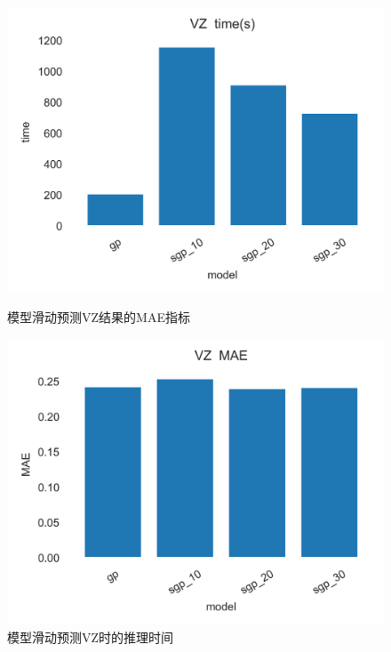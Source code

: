 \begin{figure}[!htbp]
    \centering
    \begin{minipage}[t]{0.49\textwidth}
    \centering
    \includegraphics[width=\textwidth]{images/lab3/VZ_time.png}
    \caption{模型滑动预测VZ结果的MAE指标}\label{3VZtime}
    \end{minipage}
    \begin{minipage}[t]{0.49\textwidth}
    \centering
    \includegraphics[width=\textwidth]{images/lab3/VZ_MAE.png}
    \caption{模型滑动预测VZ时的推理时间}\label{3VZMAE}
    \end{minipage}
\end{figure}

